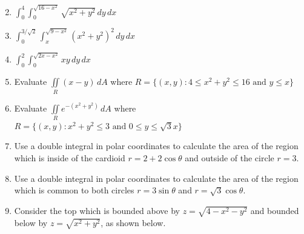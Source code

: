 \documentclass[12pt]{article}
\newif\ifans
\begin{document}

\begin{enumerate}
\setcounter{enumi}{1}

\item $\int_0^{4} \int_0^{\sqrt{16-x^2}} \sqrt{x^2+y^2} \,dy \,dx$

\ifans{\fbox{$\frac{32\pi}{3}$}} \fi

\item $\int_0^{3/\sqrt{2}} \int_x^{\sqrt{9-x^2}} \left(x^2+y^2\right)^2 \,dy \,dx$

\ifans{\fbox{$\frac{243}{8}\pi$}} \fi

\item $\int_0^{2} \int_0^{\sqrt{2x-x^2}} xy \,dy \,dx$

\ifans{\fbox{$\frac{2}{3}$}} \fi

\item Evaluate $\iint \limits_{R} (x-y) \,dA$ where $R=\{(x,y): 4 \leq x^2+y^2 \leq 16 \text{ and } y \leq x\}$

\ifans{\fbox{$\frac{112}{3}\sqrt{2}$}} \fi

\item Evaluate $\iint \limits_{R} e^{-(x^2+y^2)} \,dA$ where $R=\{(x,y): x^2+y^2 \leq 3 \text{ and } 0 \leq y \leq \sqrt{3}x\}$

\ifans{\fbox{$\frac{\pi}{6}\left(1-\frac{1}{e^3}\right)$}} \fi

\item Use a double integral in polar coordinates to calculate the area of the region which is inside of the cardioid $r=2+2\cos{\theta}$ and outside of the circle $r=3$.

\ifans{\fbox{$\frac{9\sqrt{3}}{2}-\pi$}} \fi

\item Use a double integral in polar coordinates to calculate the area of the region which is common to both circles $r=3\sin{\theta}$ and $r=\sqrt{3}\cos{\theta}$.

\ifans{\fbox{$\frac{5\pi}{8}-\frac{3\sqrt{3}}{4}$}} \fi

\item Consider the top which is bounded above by $z=\sqrt{4-x^2-y^2}$ and bounded below by $z=\sqrt{x^2+y^2}$, as shown below.


\end{enumerate}
\end{document}
